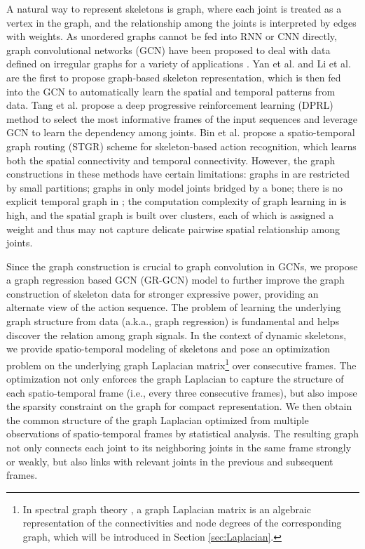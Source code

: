 \documentclass[conference]{IEEEtran}
\begin{document}
A natural way to represent skeletons is graph, where each joint is treated as a vertex in the graph, and the relationship among the joints is interpreted by edges with weights. As unordered graphs cannot be fed into RNN or CNN directly, graph convolutional networks (GCN) have been proposed to deal with data defined on irregular graphs for a variety of applications \cite{bruna2013spectral,duvenaud2015convolutional,kipf2016semi,defferrard2016convolutional}. Yan et al. \cite{yan18} and Li et al. \cite{li18spatio} are the first to propose graph-based skeleton representation, which is then fed into the GCN to automatically learn the spatial and temporal patterns from data. Tang et al. \cite{Tang_2018_CVPR} propose a deep progressive reinforcement learning (DPRL) method to select the most informative frames of the input sequences and leverage GCN to learn the dependency among joints. Bin et al. \cite{bi2019spatio} propose a spatio-temporal graph routing (STGR) scheme for skeleton-based action recognition, which learns both the spatial connectivity and temporal connectivity. However, the graph constructions in these methods have certain limitations: graphs in \cite{yan18} are restricted by small partitions; graphs in \cite{li18spatio} only model joints bridged by a bone; there is no explicit temporal graph in \cite{Tang_2018_CVPR}; the computation complexity of graph learning in \cite{bi2019spatio} is high, and the spatial graph is built over clusters, each of which is assigned a weight and thus may not capture delicate pairwise spatial relationship among joints. 

Since the graph construction is crucial to graph convolution in GCNs, we propose a graph regression based GCN (GR-GCN) model to further improve the graph construction of skeleton data for stronger expressive power, providing an alternate view of the action sequence. The problem of learning the underlying graph structure from data (a.k.a., graph regression) is fundamental and helps discover the relation among graph signals. In the context of dynamic skeletons, we provide spatio-temporal modeling of skeletons and pose an optimization problem on the underlying graph Laplacian matrix\footnote{In spectral graph theory \cite{chung1997spectral}, a graph Laplacian matrix is an algebraic representation of the connectivities and node degrees of the corresponding graph, which will be introduced in Section \ref{sec:Laplacian}.} over consecutive frames. The optimization not only enforces the graph Laplacian to capture the structure of each spatio-temporal frame (i.e., every three consecutive frames), but also impose the sparsity constraint on the graph for compact representation. We then obtain the common structure of the graph Laplacian optimized from multiple observations of spatio-temporal frames by statistical analysis. The resulting graph not only connects each joint to its neighboring joints in the same frame strongly or weakly, but also links with relevant joints in the previous and subsequent frames. 
\end{document}
